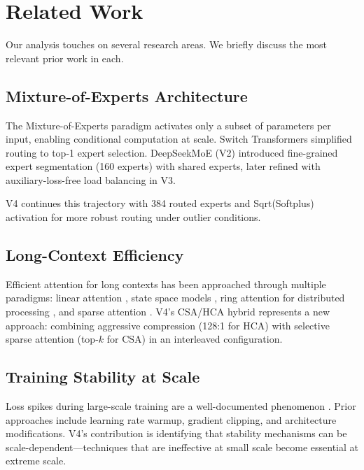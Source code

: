 \documentclass[11pt,a4paper]{article}
\begin{document}
\section{Related Work}
\label{sec:related}

Our analysis touches on several research areas. We briefly discuss the most relevant prior work in each.

\subsection{Mixture-of-Experts Architecture}

The Mixture-of-Experts paradigm \cite{shazeer2017} activates only a subset of parameters per input, enabling conditional computation at scale. Switch Transformers \cite{fedus2022} simplified routing to top-1 expert selection. DeepSeekMoE (V2) introduced fine-grained expert segmentation (160 experts) with shared experts, later refined with auxiliary-loss-free load balancing in V3.

V4 continues this trajectory with 384 routed experts and Sqrt(Softplus) activation for more robust routing under outlier conditions.

\subsection{Long-Context Efficiency}

Efficient attention for long contexts has been approached through multiple paradigms: linear attention \cite{katharopoulos2020}, state space models \cite{gu2023}, ring attention for distributed processing \cite{liu2023}, and sparse attention \cite{child2019}. V4's CSA/HCA hybrid represents a new approach: combining aggressive compression (128:1 for HCA) with selective sparse attention (top-$k$ for CSA) in an interleaved configuration.

\subsection{Training Stability at Scale}

Loss spikes during large-scale training are a well-documented phenomenon \cite{zhang2022,chowdhery2023}. Prior approaches include learning rate warmup, gradient clipping, and architecture modifications. V4's contribution is identifying that stability mechanisms can be scale-dependent---techniques that are ineffective at small scale become essential at extreme scale.
\end{document}
